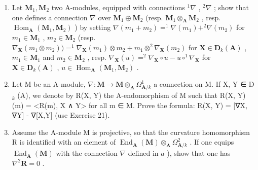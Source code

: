 \begin{enumerate}
\def\labelenumi{\alph{enumi})}
\item
  Let \(\mathbf{M}_1, \mathbf{M}_2\) two A-modules, equipped with connections \(^1\nabla\) , \(^2\nabla\) ; show that one defines a connection \(\nabla\) over \(\mathbf{M}_1 \oplus \mathbf{M}_2\) (resp. \(\mathbf{M}_1 \otimes_{\mathbf{A}} \mathbf{M}_2\) , resp. \(\operatorname{Hom}_{\mathbf{A}}(\mathbf{M}_1, \mathbf{M}_2)\) ) by setting \(\nabla(m_1 + m_2) = ^1\nabla(m_1) + ^2\nabla(m_2)\) for \(m_1 \in \mathbf{M}_1\) , \(m_2 \in \mathbf{M}_2\) (resp. \(\nabla_{\mathbf{X}}(m_1 \otimes m_2)) = ^1\nabla_{\mathbf{X}}(m_1) \otimes m_2 + m_1 \otimes ^2\nabla_{\mathbf{X}}(m_2)\) for \(\mathbf{X} \in \mathbf{D}_k(\mathbf{A})\) , \(m_1 \in \mathbf{M}_1\) and \(m_2 \in \mathbf{M}_2\) , resp. \(\nabla_{\mathbf{X}}(u) = ^2\nabla_{\mathbf{X}} \circ u - u \circ ^1\nabla_{\mathbf{X}}\) for \(\mathbf{X} \in \mathbf{D}_k(\mathbf{A})\) , \(u \in \operatorname{Hom}_{\mathbf{A}}(\mathbf{M}_1, \mathbf{M}_2)\) .
\item
  Let M be an A-module, \(\nabla: \mathbf{M} \to \mathbf{M} \otimes_{\mathbf{A}} \Omega_{\mathbf{A}/k}^{1}\) a connection on M. If X, Y ∈ D \(_{k}\) (A), we denote by R(X, Y) the A-endomorphism of M such that R(X, Y)(m) = \textless R(m), X ∧ Y\textgreater{} for all m ∈ M. Prove the formula: R(X, Y) = {[}∇X, ∇Y{]} - ∇{[}X,Y{]} (use Exercise 21).
\item
  Assume the A-module M is projective, so that the curvature homomorphism R is identified with an element of \(\operatorname{End}_{\mathbf{A}}(\mathbf{M}) \otimes_{\mathbf{A}} \Omega_{\mathbf{A}/k}^{2}\) . If one equips \(\operatorname{End}_{\mathbf{A}}(\mathbf{M})\) with the connection \(\nabla\) defined in \(a\) ), show that one has \(\nabla^{2}\mathbf{R} = 0\) .
\end{enumerate}

